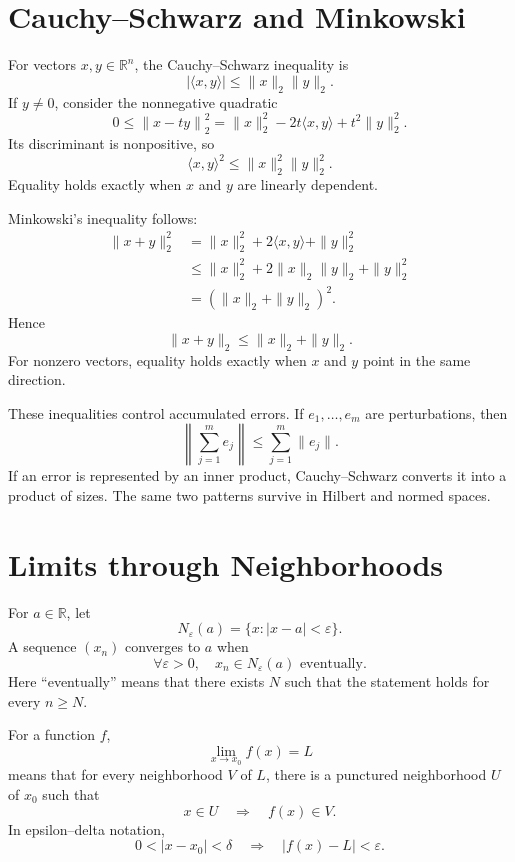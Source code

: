
\section{Cauchy--Schwarz and Minkowski}

For vectors \(x,y\in\mathbb R^n\), the Cauchy--Schwarz inequality is
\[
  |\langle x,y\rangle|
  \le \|x\|_2\|y\|_2.
\]
If \(y\ne0\), consider the nonnegative quadratic
\[
  0\le
  \left\|x-t y\right\|_2^2
  =\|x\|_2^2-2t\langle x,y\rangle+t^2\|y\|_2^2.
\]
Its discriminant is nonpositive, so
\[
  \langle x,y\rangle^2
  \le \|x\|_2^2\|y\|_2^2.
\]
Equality holds exactly when \(x\) and \(y\) are linearly dependent.

Minkowski's inequality follows:
\[
\begin{aligned}
  \|x+y\|_2^2
  &=\|x\|_2^2+2\langle x,y\rangle+\|y\|_2^2\\
  &\le\|x\|_2^2+2\|x\|_2\|y\|_2+\|y\|_2^2\\
  &=(\|x\|_2+\|y\|_2)^2.
\end{aligned}
\]
Hence
\[
  \boxed{\|x+y\|_2\le\|x\|_2+\|y\|_2.}
\]
For nonzero vectors, equality holds exactly when \(x\) and \(y\) point in the same direction.

These inequalities control accumulated errors.  If \(e_1,\ldots,e_m\) are perturbations, then
\[
  \left\|\sum_{j=1}^m e_j\right\|
  \le\sum_{j=1}^m\|e_j\|.
\]
If an error is represented by an inner product, Cauchy--Schwarz converts it into a product of sizes.  The same two patterns survive in Hilbert and normed spaces.

\section{Limits through Neighborhoods}

For \(a\in\mathbb R\), let
\[
  N_\varepsilon(a)=\{x:|x-a|<\varepsilon\}.
\]
A sequence \((x_n)\) converges to \(a\) when
\[
  \forall\varepsilon>0,
  \quad
  x_n\in N_\varepsilon(a)
  \text{ eventually}.
\]
Here ``eventually'' means that there exists \(N\) such that the statement holds for every \(n\ge N\).

For a function \(f\),
\[
  \lim_{x\to x_0}f(x)=L
\]
means that for every neighborhood \(V\) of \(L\), there is a punctured neighborhood \(U\) of \(x_0\) such that
\[
  x\in U\quad\Longrightarrow\quad f(x)\in V.
\]
In epsilon--delta notation,
\[
  0<|x-x_0|<\delta
  \quad\Longrightarrow\quad
  |f(x)-L|<\varepsilon.
\]


